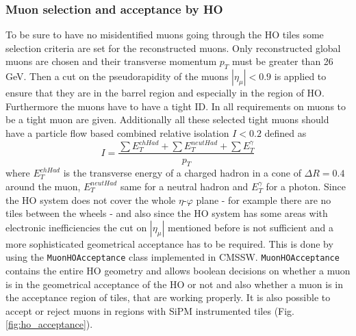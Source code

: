 		\subsubsection{Muon selection and acceptance by HO}
		\label{thesectionhere}
			To be sure to have no misidentified muons going through the HO tiles some selection criteria are set for the reconstructed muons.
			Only reconstructed global muons are chosen and their transverse momentum $p_T$ must be greater than 26\,GeV.
			Then a cut on the pseudorapidity of the muons $|\eta_\mu| < 0.9$ is applied to ensure that they are in the barrel region and especially in the region of HO.
			Furthermore the muons have to have a tight ID.
			In \cite{CMS-PAPER-MUO-10-004} all requirements on muons to be a tight muon are given.
			Additionally all these selected tight muons should have a particle flow based combined relative isolation $I<0.2$ defined as
			\begin{equation}
				I = \frac{\sum{E_T^{chHad}} + \sum{E_T^{neutHad}} + \sum{E_T^\gamma}}{p_T}
			\end{equation}
			where $E_T^{chHad}$ is the transverse energy of a charged hadron in a cone of $\Delta R = 0.4$ around the muon, $E_T^{neutHad}$ same for a neutral hadron and $E_T^\gamma$ for a photon.
			Since the HO system does not cover the whole $\eta$-$\varphi$ plane - for example there are no tiles between the wheels - and also since the HO system has some areas with electronic inefficiencies the
			cut on $|\eta_{\mu}|$ mentioned before is not sufficient and a more sophisticated geometrical acceptance has to be required.
			This is done by using the \verb+MuonHOAcceptance+ class implemented in CMSSW.
			\verb+MuonHOAcceptance+ contains the entire HO geometry and allows boolean decisions on whether a muon is in the geometrical acceptance of the HO or not and also whether a muon is in the
			acceptance region of tiles, that are working properly.
			It is also possible to accept or reject muons in regions with SiPM instrumented tiles (Fig. \ref{fig:ho_acceptance}).
